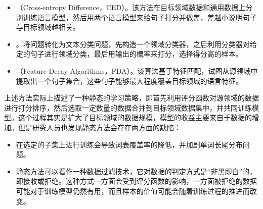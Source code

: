 \begin{itemize}
\vspace{0.5em}
\item {\small{}}（Cross-entropy Difference，CED）{\small{}}。该方法在目标领域数据和通用数据上分别训练语言模型，然后用两个语言模型来给句子打分并做差，差越小说明句子与目标领域越相关。
\vspace{0.5em}
\item {\small{}}。将问题转化为文本分类问题，先构造一个领域分类器，之后利用分类器对给定的句子进行领域分类，最后用输出的概率来打分，选择得分高的样本。
\vspace{0.5em}
\item {\small{}}（Feature Decay Algorithms，FDA）{\small{}}。该算法基于特征匹配，试图从源领域中提取出一个句子集合，这些句子能够最大程度覆盖目标领域的语言特征。
\vspace{0.5em}
\end{itemize}

\parinterval 上述方法实际上描述了一种静态的学习策略，即首先利用评分函数对源领域的数据进行打分排序，然后选取一定数量的数据合并到目标领域数据集中，并共同训练模型。这个过程其实是扩大了目标领域的数据规模，模型的收益主要来自于数据的增加。但是研究人员也发现静态方法会存在两方面的缺陷：

\begin{itemize}
\vspace{0.5em}
\item 在选定的子集上进行训练会导致词表覆盖率的降低，并加剧单词长尾分布问题。
\vspace{0.5em}
\item 静态方法可以看作一种数据过滤技术，它对数据的判定方式是“非黑即白”的，即接收或拒绝。这种方式一方面会受到评分函数的影响，一方面被拒绝的数据可能对于训练模型仍然有用，而且样本的价值可能会随着训练过程的推进而改变。
\vspace{0.5em}
\end{itemize}


